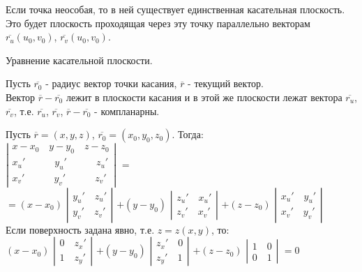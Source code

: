 Если точка неособая, то в ней существует единственная касательная плоскость. Это будет плоскость проходящая через эту точку параллельно векторам $\overline{r_u}(u_0,v_0)$, $\overline{r_v}(u_0,v_0)$.

Уравнение касательной плоскости.

Пусть $\overline{r_0}$ - радиус вектор точки касания, $\overline{r}$ - текущий вектор.
\\
Вектор $\overline{r} - \overline{r_0}$ лежит в плоскости касания и в этой же плоскости лежат вектора $\overline{r_u}$,  $\overline{r_v}$, т.е. $\overline{r_u}$,  $\overline{r_v}$, $\overline{r} - \overline{r_0}$ - компланарны.

Пусть $\overline{r} = (x,y,z)$, $\overline{r_0} = (x_0,y_0,z_0)$. Тогда:
\\
$\left|
  \begin{array}{ccc}
x - x_0 \quad y - y_0 \quad z - z_0
\\
x_u' \quad \quad \quad y_u' \quad \quad \quad z_u'
\\
x_v' \quad  \quad \quad y_v' \quad \quad \quad z_v'
  \end{array}
\right|$
$=$
\\
$=(x-x_0)$
$\left| 
  \begin{array}{ccc}
y_u' \quad z_u'
\\
y_v' \quad z_v'
  \end{array}
\right|$
$+(y-y_0)$
$\left| 
  \begin{array}{ccc}
z_u' \quad x_u'
\\
z_v' \quad x_v'
  \end{array}
\right|$
$+(z-z_0)$
$\left| 
  \begin{array}{ccc}
x_u' \quad y_u'
\\
x_v' \quad y_v'
  \end{array}
\right|$
\\
Если поверхность задана явно, т.е. $z = z(x,y)$, то:
\\
$(x-x_0)$
$\left| 
  \begin{array}{ccc}
0 \quad z_x'
\\
1 \quad z_y'
  \end{array}
\right|$
$+(y-y_0)$
$\left| 
  \begin{array}{ccc}
z_x' \quad 0
\\
z_y' \quad 1
  \end{array}
\right|$
$+(z-z_0)$
$\left| 
  \begin{array}{ccc}
1 \quad 0
\\
0 \quad 1
  \end{array}
\right|$
$=0$

